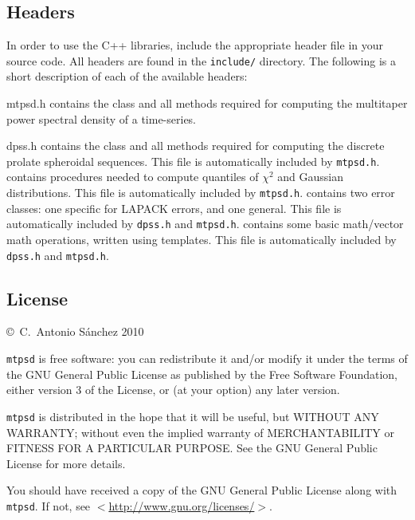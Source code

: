 \subsection{Headers}

In order to use the C++ libraries, include the appropriate header file in your source code.  All headers are found in the \texttt{include/} directory.  The following is a short description of each of the available headers:

\begin{codelist}
    \item[mtpsd.h] contains the  class and all methods required for computing the multitaper power spectral density of a time-series.
    \item[dpss.h] contains the  class and all methods required for computing the discrete prolate spheroidal sequences.  This file is automatically included by \texttt{mtpsd.h}.
     contains procedures needed to compute quantiles of $\chi^2$ and Gaussian distributions.  This file is automatically included by \texttt{mtpsd.h}.
     contains two error classes: one specific for LAPACK errors, and one general.  This file is automatically included by \texttt{dpss.h} and \texttt{mtpsd.h}.
     contains some basic math/vector math operations, written using templates.  This file is automatically included by \texttt{dpss.h} and \texttt{mtpsd.h}.
\end{codelist}

\subsection{License}
\vspace*{0.5em}

\copyright~C.~Antonio S\'anchez 2010
\vspace*{0.5em}

\noindent \texttt{mtpsd} is free software: you can redistribute it and/or modify
it under the terms of the GNU General Public License as published by
the Free Software Foundation, either version 3 of the License, or
(at your option) any later version.
\vspace*{0.5em}

\noindent \texttt{mtpsd} is distributed in the hope that it will be useful,
but WITHOUT ANY WARRANTY; without even the implied warranty of
MERCHANTABILITY or FITNESS FOR A PARTICULAR PURPOSE.  See the
GNU General Public License for more details.
\vspace*{0.5em}

\noindent You should have received a copy of the GNU General Public License
along with \texttt{mtpsd}.  If not, see $<$\url{http://www.gnu.org/licenses/}$>$.